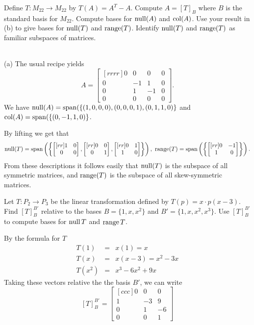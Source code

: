 \ii Define $T\colon M_{22}\rightarrow M_{22}$ by $T(A)=A^T-A$. 
\bb
\ii Compute $A=[T]_B$ where $B$ is the standard basis for $M_{22}$. 
\ii Compute bases for $\operatorname{null}(A)$ and $\operatorname{col}(A)$.
\ii Use your result in (b) to give bases for $\operatorname{null}(T)$ and $\operatorname{range}(T)$. 
\ii Identify $\operatorname{null}(T)$ and $\operatorname{range}(T)$ as familiar subspaces of matrices. 
\ee
\begin{solution}
\ \\
(a) The usual recipe yields 
\[
A=\begin{bmatrix}[rrrr]0&0&0&0\\
0&-1&1&0\\
0&1&-1&0\\
0&0&0&0
\end{bmatrix}.
\]
We have $\operatorname{null}(A)=\operatorname{span}(\{(1,0,0,0), (0,0,0,1), (0,1,1,0)\}$ and $\operatorname{col}(A)=\operatorname{span}(\{(0,-1,1,0)\}$. 

By lifting we get that 
\[
\NS(T)=\Span\left(\left\{\begin{bmatrix}[rr] 1&0\\ 0&0\end{bmatrix}, \begin{bmatrix}[rr] 0&0\\ 0&1\end{bmatrix}, \begin{bmatrix}[rr]0&1\\ 1&0 \end{bmatrix}\right\}\right), \ \range(T)=\Span\left(\left\{\begin{bmatrix}[rr] 0&-1\\ 1&0\end{bmatrix}\right\}\right).
\]
From these descriptions it follows easily that $\operatorname{null}(T)$ is the subspace of all symmetric matrices, and $\operatorname{range}(T)$ is the subspace of all skew-symmetric matrices. 
\end{solution}
\ii Let $T:P_2\rightarrow P_3$ be the linear transformation defined by $T(p)=x\cdot p(x-3)$. 
\bb
\ii Find $[T]_{B}^{B'}$ relative to the bases $B=\{1,x,x^2\}$ and $B' = \{1,x,x^2,x^3\}$.
\ii Use $[T]_{B}^{B'}$ to compute bases for $\operatorname{null} T$ and $\operatorname{range} T$. 
\ee
\begin{solution}
\noindent By the formula for $T$
\begin{eqnarray*}
T(1) &=& x(1) = x\\
T(x) &=& x(x-3) = x^2 - 3x\\
T(x^2) &=& x^3-6x^2+9x
\end{eqnarray*}
Taking these vectors relative the the basis $B'$, we can write
$$
[T]_{B}^{B'} = 
\begin{bmatrix}[ccc]
0&0&0\\
1&-3&9\\
0&1&-6\\
0&0&1
\end{bmatrix}
$$
\end{solution}
